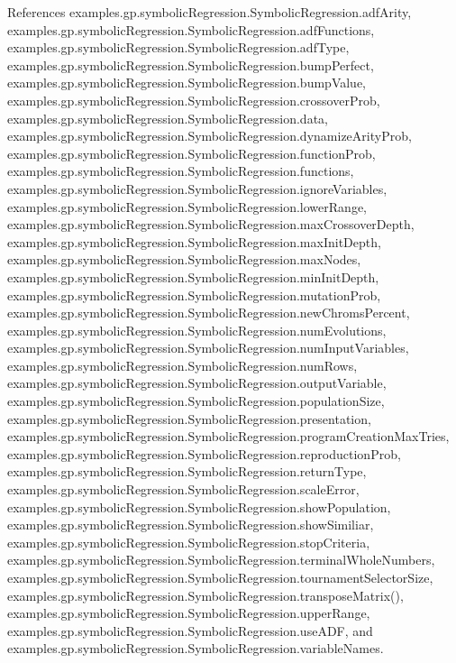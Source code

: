References examples.\-gp.\-symbolic\-Regression.\-Symbolic\-Regression.\-adf\-Arity, examples.\-gp.\-symbolic\-Regression.\-Symbolic\-Regression.\-adf\-Functions, examples.\-gp.\-symbolic\-Regression.\-Symbolic\-Regression.\-adf\-Type, examples.\-gp.\-symbolic\-Regression.\-Symbolic\-Regression.\-bump\-Perfect, examples.\-gp.\-symbolic\-Regression.\-Symbolic\-Regression.\-bump\-Value, examples.\-gp.\-symbolic\-Regression.\-Symbolic\-Regression.\-crossover\-Prob, examples.\-gp.\-symbolic\-Regression.\-Symbolic\-Regression.\-data, examples.\-gp.\-symbolic\-Regression.\-Symbolic\-Regression.\-dynamize\-Arity\-Prob, examples.\-gp.\-symbolic\-Regression.\-Symbolic\-Regression.\-function\-Prob, examples.\-gp.\-symbolic\-Regression.\-Symbolic\-Regression.\-functions, examples.\-gp.\-symbolic\-Regression.\-Symbolic\-Regression.\-ignore\-Variables, examples.\-gp.\-symbolic\-Regression.\-Symbolic\-Regression.\-lower\-Range, examples.\-gp.\-symbolic\-Regression.\-Symbolic\-Regression.\-max\-Crossover\-Depth, examples.\-gp.\-symbolic\-Regression.\-Symbolic\-Regression.\-max\-Init\-Depth, examples.\-gp.\-symbolic\-Regression.\-Symbolic\-Regression.\-max\-Nodes, examples.\-gp.\-symbolic\-Regression.\-Symbolic\-Regression.\-min\-Init\-Depth, examples.\-gp.\-symbolic\-Regression.\-Symbolic\-Regression.\-mutation\-Prob, examples.\-gp.\-symbolic\-Regression.\-Symbolic\-Regression.\-new\-Chroms\-Percent, examples.\-gp.\-symbolic\-Regression.\-Symbolic\-Regression.\-num\-Evolutions, examples.\-gp.\-symbolic\-Regression.\-Symbolic\-Regression.\-num\-Input\-Variables, examples.\-gp.\-symbolic\-Regression.\-Symbolic\-Regression.\-num\-Rows, examples.\-gp.\-symbolic\-Regression.\-Symbolic\-Regression.\-output\-Variable, examples.\-gp.\-symbolic\-Regression.\-Symbolic\-Regression.\-population\-Size, examples.\-gp.\-symbolic\-Regression.\-Symbolic\-Regression.\-presentation, examples.\-gp.\-symbolic\-Regression.\-Symbolic\-Regression.\-program\-Creation\-Max\-Tries, examples.\-gp.\-symbolic\-Regression.\-Symbolic\-Regression.\-reproduction\-Prob, examples.\-gp.\-symbolic\-Regression.\-Symbolic\-Regression.\-return\-Type, examples.\-gp.\-symbolic\-Regression.\-Symbolic\-Regression.\-scale\-Error, examples.\-gp.\-symbolic\-Regression.\-Symbolic\-Regression.\-show\-Population, examples.\-gp.\-symbolic\-Regression.\-Symbolic\-Regression.\-show\-Similiar, examples.\-gp.\-symbolic\-Regression.\-Symbolic\-Regression.\-stop\-Criteria, examples.\-gp.\-symbolic\-Regression.\-Symbolic\-Regression.\-terminal\-Whole\-Numbers, examples.\-gp.\-symbolic\-Regression.\-Symbolic\-Regression.\-tournament\-Selector\-Size, examples.\-gp.\-symbolic\-Regression.\-Symbolic\-Regression.\-transpose\-Matrix(), examples.\-gp.\-symbolic\-Regression.\-Symbolic\-Regression.\-upper\-Range, examples.\-gp.\-symbolic\-Regression.\-Symbolic\-Regression.\-use\-A\-D\-F, and examples.\-gp.\-symbolic\-Regression.\-Symbolic\-Regression.\-variable\-Names.



